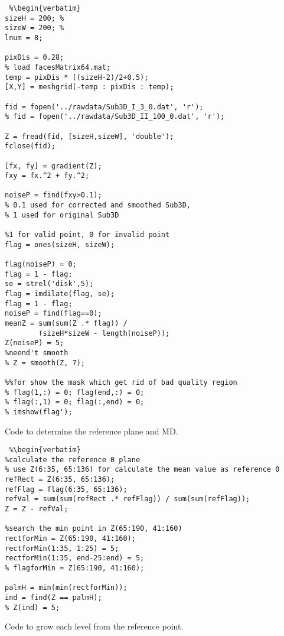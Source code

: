 \begin{lstlisting} %\begin{verbatim}
sizeH = 200; %
sizeW = 200; %
lnum = 8;

pixDis = 0.28;
% load facesMatrix64.mat;
temp = pixDis * ((sizeH-2)/2+0.5);
[X,Y] = meshgrid(-temp : pixDis : temp);

fid = fopen('../rawdata/Sub3D_I_3_0.dat', 'r');
% fid = fopen('../rawdata/Sub3D_II_100_0.dat', 'r');

Z = fread(fid, [sizeH,sizeW], 'double');
fclose(fid);

[fx, fy] = gradient(Z);
fxy = fx.^2 + fy.^2;

noiseP = find(fxy>0.1);
% 0.1 used for corrected and smoothed Sub3D,
% 1 used for original Sub3D

%1 for valid point, 0 for invalid point
flag = ones(sizeH, sizeW);

flag(noiseP) = 0;
flag = 1 - flag;
se = strel('disk',5);
flag = imdilate(flag, se);
flag = 1 - flag;
noiseP = find(flag==0);
meanZ = sum(sum(Z .* flag)) /
        (sizeH*sizeW - length(noiseP));
Z(noiseP) = 5;
%neend't smooth
% Z = smooth(Z, 7);

%%for show the mask which get rid of bad quality region
% flag(1,:) = 0; flag(end,:) = 0;
% flag(:,1) = 0; flag(:,end) = 0;
% imshow(flag');
\end{lstlisting} %
\clearpage

Code to determine the reference plane and MD.

\begin{lstlisting} %\begin{verbatim}
%calculate the reference 0 plane
% use Z(6:35, 65:136) for calculate the mean value as reference 0
refRect = Z(6:35, 65:136);
refFlag = flag(6:35, 65:136);
refVal = sum(sum(refRect .* refFlag)) / sum(sum(refFlag));
Z = Z - refVal;

%search the min point in Z(65:190, 41:160)
rectforMin = Z(65:190, 41:160);
rectforMin(1:35, 1:25) = 5;
rectforMin(1:35, end-25:end) = 5;
% flagforMin = Z(65:190, 41:160);

palmH = min(min(rectforMin));
ind = find(Z == palmH);
% Z(ind) = 5;
\end{lstlisting} %
\clearpage

Code to grow each level from the reference point.

